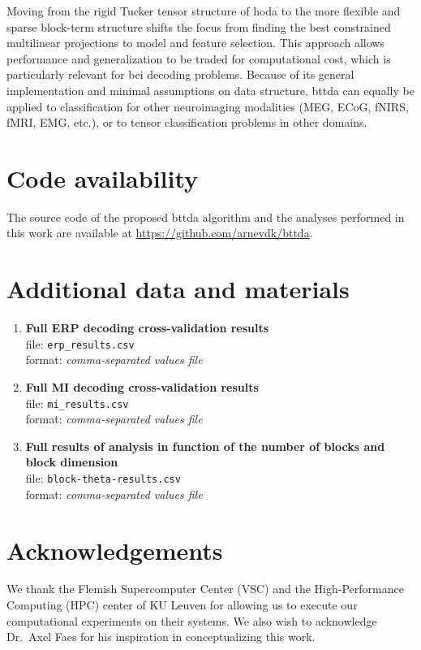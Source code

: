 \documentclass[twocolumn]{article}
\begin{document}
Moving from the rigid Tucker tensor structure of \ac{hoda} to the more flexible
and sparse block-term structure shifts the focus from finding the best constrained
multilinear projections to model and feature selection.
This approach allows performance and generalization to be traded for computational cost,
which is particularly relevant for \ac{bci} decoding problems.
Because of its general implementation and minimal assumptions on data structure,
\ac{bttda} can equally be applied to classification for other neuroimaging modalities
(MEG, ECoG, fNIRS, fMRI, EMG, etc.), or to tensor classification problems in other
domains.

\section*{Code availability}

The source code of the proposed \ac{bttda} algorithm and the analyses performed in
this work are available at \url{https://github.com/arnevdk/bttda}.

\section*{Additional data and materials}
\begin{enumerate}
	\item\textbf{Full ERP decoding cross-validation results} \\
	file: \texttt{erp\_results.csv}\\
	format: \textit{comma-separated values file}
	\label{item:add/erp-results}
	\item\textbf{Full MI decoding cross-validation results} \\
	file: \texttt{mi\_results.csv}\\
	format: \textit{comma-separated values file}
	\label{item:add/mi-results}
	\item\textbf{Full results of analysis in function of the number of blocks and block dimension}\\
	file: \texttt{block-theta-results.csv}\\
	format: \textit{comma-separated values file}
	\label{item:add/blocks}
\end{enumerate}

\section*{Acknowledgements}
We thank the Flemish Supercomputer Center (VSC) and the High-Performance
Computing (HPC) center of KU Leuven for allowing us to execute our
computational experiments on their systems.
We also wish to acknowledge Dr.\ Axel Faes for his inspiration in
conceptualizing this work.
\end{document}
